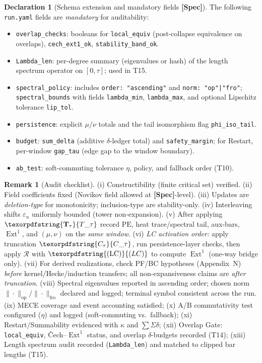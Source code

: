 \documentclass[11pt]{article}
\numberwithin{equation}{section}
\theoremstyle{plain}
\theoremstyle{definition}
\theoremstyle{remark}
\DeclareMathOperator{\Ext}{Ext}
\DeclareRobustCommand{\hyp}{\nobreakdash-}
\newcommand{\Rfun}{\mathcal{R}}
\theoremstyle{plain}
\theoremstyle{definition}
\numberwithin{equation}{section}
\theoremstyle{definition}
\newtheorem{remark}[theorem]{Remark}
\newtheorem{declaration}[theorem]{Declaration}
\DeclareRobustCommand{\Ttau}{\texorpdfstring{\ensuremath{\mathbf{T}_{\tau}}}{T\_\tau}}
\DeclareRobustCommand{\Ctau}{\texorpdfstring{\ensuremath{C_{\tau}}}{C\_\tau}}
\DeclareRobustCommand{\LC}{\texorpdfstring{\ensuremath{\mathrm{(LC)}}}{(LC)}}
\numberwithin{equation}{section}
\theoremstyle{plain}
\theoremstyle{definition}
\theoremstyle{remark}
\providecommand{\Cfun}[1]{\mathsf{C}_{#1}}
\providecommand{\Tfun}[1]{\mathbf{T}_{#1}}
\providecommand{\Ctau}{\Cfun{\tau}}
\providecommand{\Ttau}{\Tfun{\tau}}
\begin{document}
\begin{declaration}[Schema extension and mandatory fields \textbf{[Spec]}]\label{dec:12-schema}
The following \texttt{run.yaml} fields are \emph{mandatory} for auditability:
\begin{itemize}
  \item \texttt{overlap\_checks}: booleans for \texttt{local\_equiv} (post\hyp collapse equivalence on overlaps), \texttt{cech\_ext1\_ok}, \texttt{stability\_band\_ok}.
  \item \texttt{Lambda\_len}: per\hyp degree summary (eigenvalues or hash) of the length spectrum operator on \([0,\tau]\); used in T15.
  \item \texttt{spectral\_policy}: includes \texttt{order: "ascending"} and \texttt{norm: "op"|"fro"}; \texttt{spectral\_bounds} with fields \texttt{lambda\_min}, \texttt{lambda\_max}, and optional Lipschitz tolerance \texttt{lip\_tol}.
  \item \texttt{persistence}: explicit \(\mu/\nu\) totals and the tail isomorphism flag \texttt{phi\_iso\_tail}.
  \item \texttt{budget}: \texttt{sum\_delta} (additive \(\delta\)\hyp ledger total) and \texttt{safety\_margin}; for Restart, per\hyp window \texttt{gap\_tau} (edge gap to the window boundary).
  \item \texttt{ab\_test}: soft\hyp commuting tolerance \(\eta\), policy, and fallback order (T10).
\end{itemize}
\end{declaration}

\begin{remark}[Audit checklist]\label{rk:12-audit}
(i) Constructibility (finite critical set) verified.\;
(ii) Field coefficients fixed (Novikov field allowed at \textbf{[Spec]}\hyp level).\;
(iii) Updates are \emph{deletion\hyp type} for monotonicity; inclusion\hyp type are stability\hyp only.\;
(iv) Interleaving shifts \(\varepsilon_n\) uniformly bounded (tower non\hyp expansion).\;
(v) After applying \(\Ttau\) record \(\mathrm{PE}\), heat trace/spectral tail, aux\hyp bars, \(\Ext^1\), and \((\mu,\nu)\) on the \emph{same window}.\;
(vi) \emph{LC activation order:} apply truncation \(\Ctau\), run persistence\hyp layer checks, then apply \(\Rfun\) with \(\LC\) to compute \(\Ext^1\) (one\hyp way bridge only).\;
(vii) For derived realizations, check PF/BC hypotheses (Appendix~N) \emph{before} kernel/Hecke/induction transfers; all non\hyp expansiveness claims are \emph{after truncation}.\;
(viii) Spectral eigenvalues reported in ascending order; chosen norm \(\|\cdot\|_{\mathrm{op}}\)/\(\|\cdot\|_{\mathrm{fro}}\) declared and logged; terminal symbol consistent across the run.\;
(ix) MECE coverage and event accounting satisfied;\;
(x) A/B commutativity test configured (\(\eta\)) and logged (soft\hyp commuting vs.\ fallback);\;
(xi) Restart/Summability evidenced with \(\kappa\) and \(\sum \Sigma\delta\);\;
(xii) Overlap Gate: \texttt{local\_equiv}, Čech–\(\Ext^1\) status, and overlap \(\delta\)\hyp budgets recorded (T14);\;
(xiii) Length spectrum audit recorded (\texttt{Lambda\_len}) and matched to clipped bar lengths (T15).
\end{remark}
\end{document}
